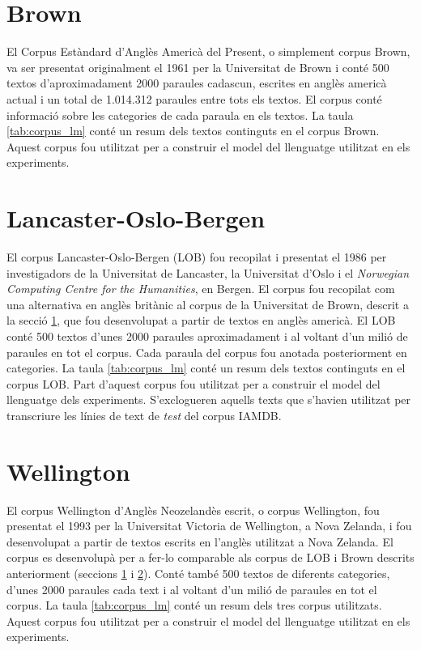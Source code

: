\section{Brown}\label{sec:corpus_brown}
El Corpus Estàndard d'Anglès Americà del Present, o simplement corpus Brown, va ser presentat originalment el 1961\cite{francis1979brown} per la Universitat de Brown i conté 500 textos d'aproximadament 2000 paraules cadascun, escrites en anglès americà actual i un total de 1.014.312 paraules entre tots els textos. El corpus conté informació sobre les categories de cada paraula en els textos. La taula \ref{tab:corpus_lm} conté un resum dels textos continguts en el corpus Brown. Aquest corpus fou utilitzat per a construir el model del llenguatge utilitzat en els experiments.

\section{Lancaster-Oslo-Bergen}\label{sec:corpus_lob}
El corpus Lancaster-Oslo-Bergen (LOB) fou recopilat i presentat el 1986\cite{johansson1986tagged} per investigadors de la Universitat de Lancaster, la Universitat d'Oslo i el \emph{Norwegian Computing Centre for the Humanities}, en Bergen. El corpus fou recopilat com una alternativa en anglès britànic al corpus de la Universitat de Brown, descrit a la secció \ref{sec:corpus_brown}, que fou desenvolupat a partir de textos en anglès americà. El LOB conté 500 textos d'unes 2000 paraules aproximadament i al voltant d'un milió de paraules en tot el corpus. Cada paraula del corpus fou anotada posteriorment en categories. La taula \ref{tab:corpus_lm} conté un resum dels textos continguts en el corpus LOB. Part d'aquest corpus fou utilitzat per a construir el model del llenguatge dels experiments. S'exclogueren aquells texts que s'havien utilitzat per transcriure les línies de text de \emph{test} del corpus IAMDB.

\section{Wellington}\label{sec:corpus_wellington}
El corpus Wellington d'Anglès Neozelandès escrit, o corpus Wellington, fou presentat el 1993\cite{bauer1993manual} per la Universitat Victoria de Wellington, a Nova Zelanda, i fou desenvolupat a partir de textos escrits en l'anglès utilitzat a Nova Zelanda. El corpus es desenvolupà per a fer-lo comparable als corpus de LOB i Brown descrits anteriorment (seccions \ref{sec:corpus_brown} i \ref{sec:corpus_lob}). Conté també 500 textos de diferents categories, d'unes 2000 paraules cada text i al voltant d'un milió de paraules en tot el corpus. La taula \ref{tab:corpus_lm} conté un resum dels tres corpus utilitzats. Aquest corpus fou utilitzat per a construir el model del llenguatge utilitzat en els experiments.

